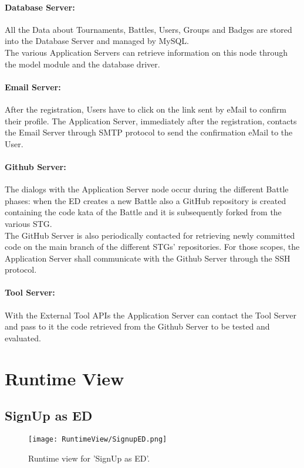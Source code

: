 \paragraph{Database Server:}
All the Data about Tournaments, Battles, Users, Groups and Badges are stored into the Database Server and managed by MySQL.\\
The various Application Servers can retrieve information on this node through the model module and the database driver.

\paragraph{Email Server:}
After the registration, Users have to click on the link sent by eMail to confirm their profile. The Application Server, immediately after the registration, contacts the Email Server through SMTP protocol to send the confirmation eMail to the User.

\paragraph{Github Server:}
The dialogs with the Application Server node occur during the different Battle phases: when the ED creates a new Battle also a GitHub repository is created containing the code kata of the Battle and it is subsequently forked from the various STG.\\
The GitHub Server is also periodically contacted for retrieving newly committed code on the main branch of the different STGs' repositories.
For those scopes, the Application Server shall communicate with the Github Server through the SSH protocol.


\paragraph{Tool Server:}
With the External Tool APIs the Application Server can contact the Tool Server and pass to it the code retrieved from the Github Server to be tested and evaluated.

\newpage
\section{Runtime View}
\label{sec:runtime_view}%

\subsection{SignUp as ED}
\begin{figure}[H]
    \begin{center}
        \texttt{[image: RuntimeView/SignupED.png]}
        \caption{Runtime view for 'SignUp as ED'.}
        \label{fig:runtime_signupasED}%
    \end{center}
\end{figure}

